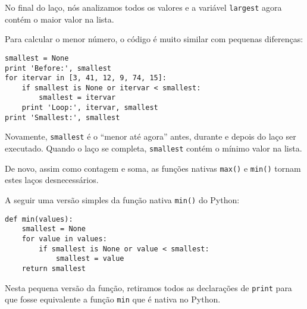 
No final do laço, nós analizamos todos os valores e a variável {\tt largest}
agora contém o maior valor na lista.


Para calcular o menor número, o código é muito similar com pequenas
diferenças:

\beforeverb
\begin{verbatim}
smallest = None
print 'Before:', smallest
for itervar in [3, 41, 12, 9, 74, 15]:
    if smallest is None or itervar < smallest:
        smallest = itervar
    print 'Loop:', itervar, smallest
print 'Smallest:', smallest
\end{verbatim}
\afterverb
%

Novamente, {\tt smallest} é o ``menor até agora'' antes, durante e depois do
laço ser executado. Quando o laço se completa, {\tt smallest} contém o mínimo
valor na lista.


De novo, assim como contagem e soma, as funções nativas {\tt max()} e
{\tt min()} tornam estes laços desnecessários.


A seguir uma versão simples da função nativa {\tt min()} do Python:

\beforeverb
\begin{verbatim}
def min(values):
    smallest = None
    for value in values:
        if smallest is None or value < smallest:
            smallest = value
    return smallest
\end{verbatim}
\afterverb
%

%
Nesta pequena versão da função, retiramos todos as declarações de {\tt print}
para que fosse equivalente a função {\tt min} que é nativa no Python.

